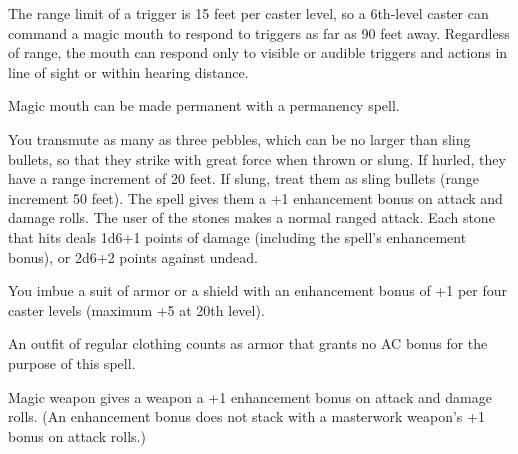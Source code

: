 \begin{multicols}{2}
\begin{small}
\smallskip\noindent The range limit of a trigger is 15 feet per caster level, so a 6th-level caster can command a magic mouth to respond to triggers as far as 90 feet away. Regardless of range, the mouth can respond only to visible or audible triggers and actions in line of sight or within hearing distance.

\smallskip\noindent Magic mouth can be made permanent with a permanency spell.


\noindent You transmute as many as three pebbles, which can be no larger than sling bullets, so that they strike with great force when thrown or slung. If hurled, they have a range increment of 20 feet. If slung, treat them as sling bullets (range increment 50 feet). The spell gives them a +1 enhancement bonus on attack and damage rolls. The user of the stones makes a normal ranged attack. Each stone that hits deals 1d6+1 points of damage (including the spell's enhancement bonus), or 2d6+2 points against undead.

\noindent You imbue a suit of armor or a shield with an enhancement bonus of +1 per four caster levels (maximum +5 at 20th level).

\smallskip\noindent An outfit of regular clothing counts as armor that grants no AC bonus for the purpose of this spell.

\noindent Magic weapon gives a weapon a +1 enhancement bonus on attack and damage rolls. (An enhancement bonus does not stack with a masterwork weapon's +1 bonus on attack rolls.)


\end{small}
\end{multicols}
